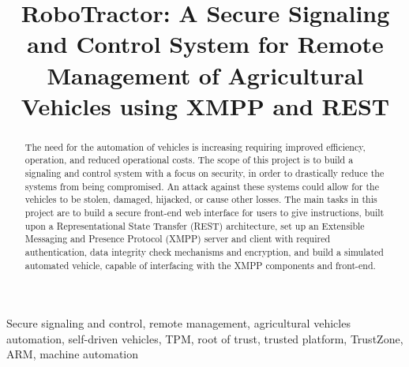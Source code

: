 \documentclass[conference,12pt]{IEEEtran}
\begin{document}
%
\title{RoboTractor: A Secure Signaling and Control System for Remote Management of Agricultural Vehicles using XMPP and REST}

\author{
\and
{}
\and
{}
}
\maketitle


\begin{abstract}
The need for the automation of vehicles is increasing requiring
improved efficiency, operation, and reduced operational costs. The scope of this
project is to build a signaling and control system with
a focus on security, in order to drastically reduce the systems from being compromised.
An attack against these systems could allow for the vehicles to be stolen, damaged, hijacked, or cause other losses.
The main tasks in this project are to build a secure front-end
web interface for users to give instructions, built upon a Representational
State Transfer (REST) architecture, set up an Extensible Messaging and
Presence Protocol (XMPP) server and client with required
authentication, data integrity check mechanisms and encryption, and build a
simulated automated vehicle, capable of interfacing with the XMPP
components and front-end.
\end{abstract}

\begin{IEEEkeywords}
    Secure signaling and control, remote management, agricultural vehicles
    automation, self-driven vehicles, TPM, root of trust, trusted platform,
    TrustZone, ARM, machine automation
\end{IEEEkeywords}
\end{document}
